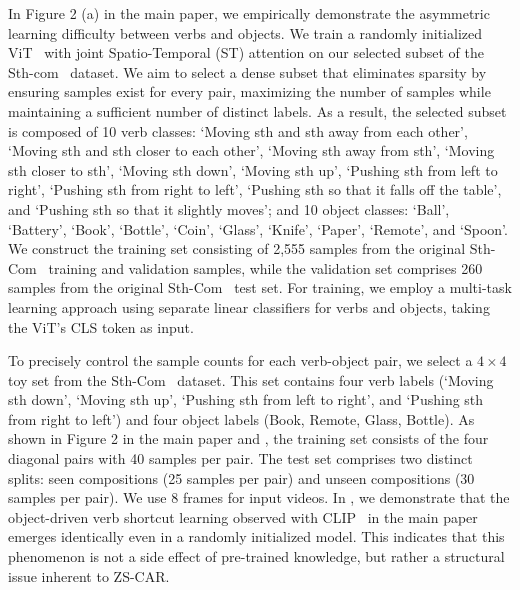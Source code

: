 In Figure 2 (a) in the main paper, we empirically demonstrate the asymmetric learning difficulty between verbs and objects.
We train a randomly initialized ViT~\cite{dosovitskiy202vit} with joint Spatio-Temporal (ST) attention on our selected subset of the Sth-com~\cite{li2024c2c} dataset. 
We aim to select a dense subset that eliminates sparsity by ensuring samples exist for every pair, maximizing the number of samples while maintaining a sufficient number of distinct labels.
As a result, the selected subset is composed of 10 verb classes: `Moving sth and sth away from each other', `Moving sth and sth closer to each other', `Moving sth away from sth', `Moving sth closer to sth', `Moving sth down', `Moving sth up', `Pushing sth from left to right', `Pushing sth from right to left', `Pushing sth so that it falls off the table', and `Pushing sth so that it slightly moves'; and 10 object classes: `Ball', `Battery', `Book', `Bottle', `Coin', `Glass', `Knife', `Paper', `Remote', and `Spoon'.
We construct the training set consisting of 2,555 samples from the original Sth-Com~\cite{li2024c2c} training and validation samples, while the validation set comprises 260 samples from the original Sth-Com~\cite{li2024c2c} test set.
For training, we employ a multi-task learning approach using separate linear classifiers for verbs and objects, taking the ViT's CLS token as input. 



To precisely control the sample counts for each verb-object pair, we select a $4 \times 4$ toy set from the Sth-Com~\cite{li2024c2c} dataset.
This set contains four verb labels (`Moving sth down', `Moving sth up', `Pushing sth from left to right', and `Pushing sth from right to left') and four object labels (Book, Remote, Glass, Bottle). 
As shown in Figure 2 in the main paper and , the training set consists of the four diagonal pairs with 40 samples per pair. 
The test set comprises two distinct splits: seen compositions (25 samples per pair) and unseen compositions (30 samples per pair).
We use 8 frames for input videos.
In , we demonstrate that the object-driven verb shortcut learning observed with CLIP~\cite{radford2021clip} in the main paper emerges identically even in a randomly initialized model. 
This indicates that this phenomenon is not a side effect of pre-trained knowledge, but rather a structural issue inherent to ZS-CAR.



